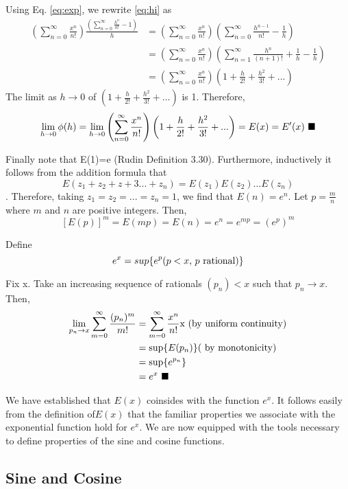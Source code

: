\documentclass{article}
\begin{document}
Using Eq. \ref{eq:exp}, we rewrite \ref{eq:hi} as 
\begin{align}
\left(\sum_{n=0}^\infty\frac{x^n}{n!}\right)\frac{(\sum_{n=0}^\infty \frac{h^n}{n!}-1)}{h}&=\left(\sum_{n=0}^\infty\frac{x^n}{n!}\right)\left(\sum_{n=0}^\infty \frac{h^{n-1}}{n!}-\frac{1}{h}\right)\\
&= \left(\sum_{n=0}^\infty\frac{x^n}{n!}\right)\left(\sum_{n=1}^\infty \frac{h^{n}}{(n+1)!}+\frac{1}{h}-\frac{1}{h}\right)\\
&=\left(\sum_{n=0}^\infty\frac{x^n}{n!}\right)\left(1+\frac{h}{2!}+\frac{h^2}{3!}+...\right)
\end{align}
The limit as $h\rightarrow 0$  of  $\left(1+\frac{h}{2!}+\frac{h^2}{3!}+...\right)$ is 1.  Therefore,
$$\lim_{h\rightarrow 0} \phi(h)= \lim_{h\rightarrow 0}  \left(\sum_{n=0}^\infty\frac{x^n}{n!}\right)\left(1+\frac{h}{2!}+\frac{h^2}{3!}+...\right)= E(x)=E'(x)\hbox{  } \blacksquare$$  

Finally note that E(1)=e (Rudin Definition 3.30).  Furthermore, inductively it follows from the addition formula that 
$$E(z_1+z_2+z+3...+z_n)=E(z_1)E(z_2)...E(z_n)$$ .  Therefore, taking $z_1=z_2=...=z_n=1$, we find that $E(n)=e^n$.    Let $p=\frac{m}{n}$ where $m$ and $n$ are positive integers.  Then,
$$[E(p)]^m =E(mp)=E(n)=e^n=e^{mp}=(e^{p})^m$$


Define $$e^x=sup \{e^p \hbox{($p<x$, $p$ rational)}\}$$


Fix x.  Take an increasing sequence of rationals $(p_n)<x$ such that $p_n \rightarrow x$.  
\newpage 
Then,
\begin{align}
\lim_{p_n\rightarrow x} \sum_{m=0}^{\infty} \frac{(p_n)^m}{m!} &=\sum_{m=0}^\infty \frac{x^n}{n!} \hbox{x (by uniform continuity)}\\
&=\sup \{E(p_n) \}\hbox{( by monotonicity)}\\
&=\sup\{ e^{p_n}\}\\
&=e^x   \hbox{  } \blacksquare
\end{align}

We have established that $E(x)$ coinsides with the function $e^x$.  It follows easily from the definition of$ E(x)$ that the familiar properties we associate with the exponential function hold for $e^x$.  We are now equipped with the tools necessary to define properties of the sine and cosine functions.
\subsection{Sine and Cosine}
\end{document}
